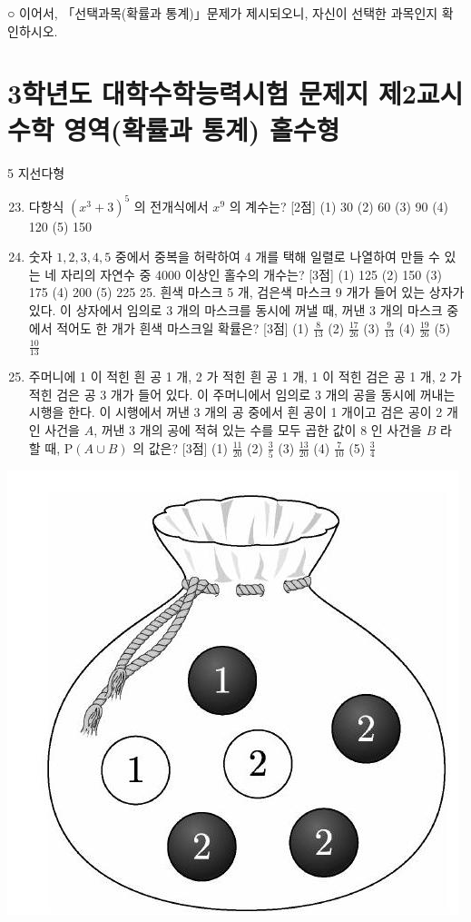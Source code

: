 \documentclass[10pt]{article}
\begin{document}
○ 이어서, 「선택과목(확률과 통계)」문제가 제시되오니, 자신이 선택한 과목인지 확인하시오.

\section{3학년도 대학수학능력시험 문제지
제2교시 수학 영역(확률과 통계)
홀수형}
5 지선다형

\begin{enumerate}
  \setcounter{enumi}{22}
  \item 다항식 $\left(x^{3}+3\right)^{5}$ 의 전개식에서 $x^{9}$ 의 계수는? [2점]
(1) 30
(2) 60
(3) 90
(4) 120
(5) 150

  \item 숫자 $1,2,3,4,5$ 중에서 중복을 허락하여 4 개를 택해 일렬로 나열하여 만들 수 있는 네 자리의 자연수 중 4000 이상인 홀수의 개수는? [3점]
(1) 125
(2) 150
(3) 175
(4) 200
(5) 225 25. 흰색 마스크 5 개, 검은색 마스크 9 개가 들어 있는 상자가 있다. 이 상자에서 임의로 3 개의 마스크를 동시에 꺼낼 때, 꺼낸 3 개의 마스크 중에서 적어도 한 개가 흰색 마스크일 확률은? [3점]
(1) $\frac{8}{13}$
(2) $\frac{17}{26}$
(3) $\frac{9}{13}$
(4) $\frac{19}{26}$
(5) $\frac{10}{13}$

  \item 주머니에 1 이 적힌 흰 공 1 개, 2 가 적힌 흰 공 1 개, 1 이 적힌 검은 공 1 개, 2 가 적힌 검은 공 3 개가 들어 있다. 이 주머니에서 임의로 3 개의 공을 동시에 꺼내는 시행을 한다. 이 시행에서 꺼낸 3 개의 공 중에서 흰 공이 1 개이고 검은 공이 2 개인 사건을 $A$, 꺼낸 3 개의 공에 적혀 있는 수를 모두 곱한 값이 8 인 사건을 $B$ 라 할 때, $\mathrm{P}(A \cup B)$ 의 값은? [3점]
(1) $\frac{11}{20}$
(2) $\frac{3}{5}$
(3) $\frac{13}{20}$
(4) $\frac{7}{10}$
(5) $\frac{3}{4}$

\end{enumerate}

\begin{center}
\includegraphics[max width=\textwidth]{2023_05_20_665dd8a057732da498f1g-10}
\end{center}
\end{document}
